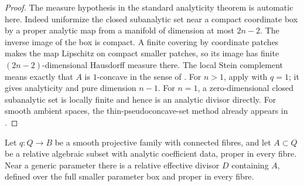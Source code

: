 \begin{proof}
The measure hypothesis in the standard analyticity theorem is
automatic here. Indeed uniformize the closed subanalytic set near
a compact coordinate box by a proper analytic map from a manifold
of dimension at most $2n-2$. The inverse image of the box is
compact. A finite covering by coordinate patches makes the map
Lipschitz on compact smaller patches, so its image has finite
$(2n-2)$-dimensional Hausdorff measure there. The local Stein
complement means exactly that $A$ is $1$-concave in the sense of
\cite[Definition 1]{Vajaitu2000}. For $n>1$, apply
\cite[Theorem 1]{Vajaitu2000} with $q=1$; it gives analyticity and
pure dimension $n-1$. For $n=1$, a zero-dimensional closed
subanalytic set is locally finite and hence is an analytic divisor
directly. For smooth ambient spaces, the thin-pseudoconcave-set method
already appears in \cite[Theorem~1.4]{Hirschowitz1973}.
\end{proof}

\begin{lemma}
\label{holes:relative-divisor-container}
Let $q:Q\to B$ be a smooth projective family with connected fibres,
and let $A\subset Q$ be a relative algebraic subset with analytic
coefficient data, proper in every fibre. Near a generic parameter
there is a relative effective divisor $D$ containing $A$, defined
over the full smaller parameter box and proper in every fibre.
\end{lemma}

